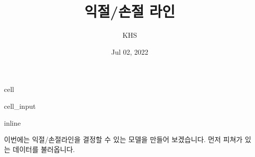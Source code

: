 \documentclass[letterpaper,10pt,english]{jupyterBook}
\title{익절/손절 라인}
\date{Jul 02, 2022}
\author{KHS}
\begin{document}
\pagestyle{empty}
\sphinxmaketitle
\pagestyle{plain}
\sphinxtableofcontents
\pagestyle{normal}
\label{\detokenize{chapter6/6.2.1_Profit_Loss_Sell::doc}}
\begin{sphinxuseclass}{cell}\begin{sphinxVerbatimInput}

\begin{sphinxuseclass}{cell_input}
\begin{sphinxVerbatim}[commandchars=\\\{\}]
   
   
 inline
   
   
 
 
 
\end{sphinxVerbatim}

\end{sphinxuseclass}\end{sphinxVerbatimInput}

\end{sphinxuseclass}


\sphinxAtStartPar
 이번에는 익절/손절라인을 결정할 수 있는 모델을 만들어 보겠습니다. 먼저 피쳐가 있는 데이터를 불러옵니다.
\end{document}
